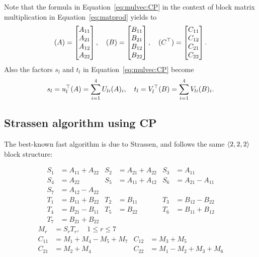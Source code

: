 \documentclass[a4paper, leqno, 11pt]{article}
\renewcommand{\mathbb}[1]{\mathds{#1}}
\newcommand{\C}{\mathbb{C}}
\let\Vec\relax
\DeclareMathOperator{\Vec}{vec}
\theoremstyle{definition}
\theoremstyle{remark}
\theoremstyle{experimental}
\begin{document}
Note that the formula in Equation~\ref{eq:mulvec:CP} in the context of block matrix multiplication in
Equation~\ref{eq:matprod} yields to
\begin{equation*}
  \Vec(A) = \begin{bmatrix} A_{11}\\A_{21}\\A_{12}\\A_{22} \end{bmatrix} 
, \quad
\Vec(B) = \begin{bmatrix} B_{11}\\B_{21}\\B_{12}\\B_{22} \end{bmatrix},\quad
\Vec(C^{\top}) = \begin{bmatrix} C_{11}\\C_{12}\\C_{21}\\C_{22} \end{bmatrix}.
\end{equation*}
Also the factors $ s_l $ and $ t_l $ in Equation~\ref{eq:mulvec:CP} become
\begin{equation*}
  s_l = u_l^{\top}\Vec(A) = \sum_{i=1}^4 U_{li}\Vec(A)_i, \quad t_l = V_l^{\top}\Vec(B) =
  \sum_{i=1}^4 V_{li}\Vec(B)_i.
\end{equation*}


\subsection{Strassen algorithm using CP}
\label{sec:cpstrassen}

The best-known fast algorithm is due to Strassen, and follows the same $ \angb{2,2,2} $ block structure:

\begin{align*}
S_1 &= A_{11} + A_{22} & S_2 &= A_{21} + A_{22} & S_3 &= A_{11} \\
S_4 &= A_{22} & S_5 &= A_{11} + A_{12} & S_6 &= A_{21} - A_{11} \\
S_7 &= A_{12} - A_{22} \\
T_1 &= B_{11} + B_{22} & T_2 &= B_{11} & T_3 &= B_{12} - B_{22} \\
T_4 &= B_{21} - B_{11} & T_5 &= B_{22} &T_6 &= B_{11} + B_{12} \\
T_7 &= B_{21} + B_{22}
\end{align*}
\begin{align*}
M_r &= S_rT_r, \quad 1 \le r \le 7 \\
C_{11} &= M_1 + M_4 - M_5 + M_7 & C_{12} &= M_3 + M_5 \\
C_{21} &= M_2 + M_4 & C_{22} &= M_1 - M_2 + M_3 + M_6
\end{align*}
\end{document}
